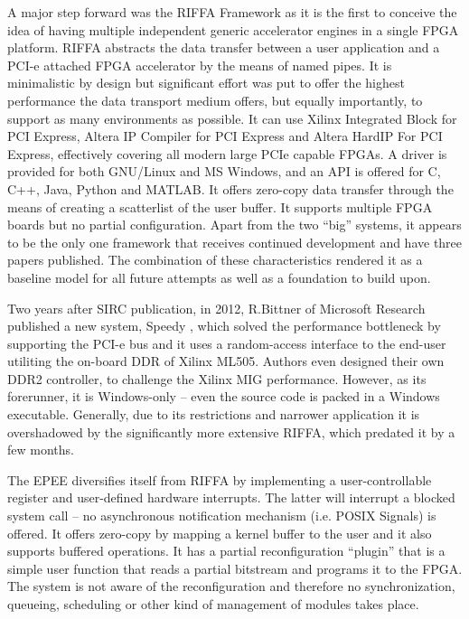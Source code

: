 A major step forward was the RIFFA Framework \cite{riffa} as it is the first to conceive the idea of having multiple 
independent generic accelerator engines in a single FPGA platform.
RIFFA abstracts the data transfer between a user application and a PCI-e attached FPGA accelerator by the means of named pipes. 
It is minimalistic by design but significant effort was put to offer the highest performance the data transport medium offers,
but equally importantly, to support as many environments as possible.
It can use Xilinx Integrated Block for PCI Express, Altera IP Compiler for PCI Express and Altera HardIP For PCI Express,
effectively covering all modern large PCIe capable FPGAs. A driver is provided for both GNU/Linux and MS Windows,
and an API is offered for C, C++, Java, Python and MATLAB. It offers zero-copy data transfer through the means of
creating a \gls{scatterlist} of the user buffer. It supports multiple FPGA boards but no partial configuration. 
Apart from the two ``big'' systems, it appears to be the only one framework that receives continued development and have three papers published.
The combination of these characteristics rendered it as a baseline model for all future attempts as well as a foundation to build upon.

Two years after SIRC publication, in 2012, R.Bittner of Microsoft Research published a new system, 
Speedy \cite{speedy}, which solved the performance bottleneck by supporting the PCI-e bus 
and it uses a random-access interface to the end-user utiliting the on-board DDR of Xilinx ML505.
Authors even designed their own DDR2 controller, to challenge the Xilinx MIG performance.
However, as its forerunner, it is Windows-only -- even the source code is packed in a Windows executable.
Generally, due to its restrictions and narrower application it is overshadowed by the significantly more extensive RIFFA,
which predated it by a few months.

The EPEE \cite{epee} diversifies itself from RIFFA by implementing a user-controllable register and user-defined hardware interrupts.
The latter will interrupt a blocked system call -- no asynchronous notification mechanism (i.e. POSIX Signals) is offered.
It offers zero-copy by mapping a kernel buffer to the user and it also supports buffered operations. 
It has a partial reconfiguration ``plugin'' that is a simple user function that reads a partial bitstream and programs it to the FPGA.
The system is not aware of the reconfiguration and therefore no synchronization, 
queueing, scheduling or other kind of management of modules takes place.

